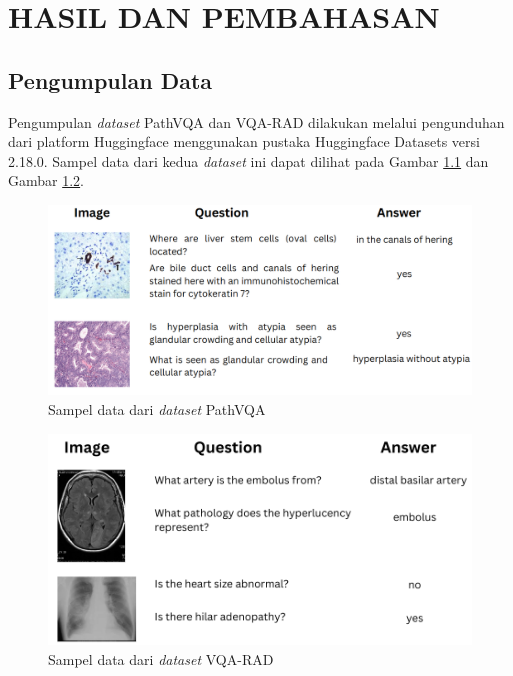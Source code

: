 \chapter{HASIL DAN PEMBAHASAN}

\section{Pengumpulan Data}

\par Pengumpulan \textit{dataset} PathVQA dan VQA-RAD dilakukan melalui pengunduhan dari platform Huggingface menggunakan pustaka Huggingface Datasets versi 2.18.0. Sampel data dari kedua \textit{dataset} ini dapat dilihat pada Gambar \ref{fig:sample-data-pathvqa} dan Gambar \ref{fig:sample-data-vqarad}.

\begin{figure}[H]
  \centering
  \includegraphics[width=14cm]{image/bab4/sample-pathvqa.png}
  \caption{Sampel data dari \textit{dataset} PathVQA}
  \label{fig:sample-data-pathvqa}
\end{figure}

\begin{figure}[H]
  \centering
  \includegraphics[width=14cm]{image/bab4/sample-vqarad.png}
  \caption{Sampel data dari \textit{dataset} VQA-RAD}
  \label{fig:sample-data-vqarad}
\end{figure}

